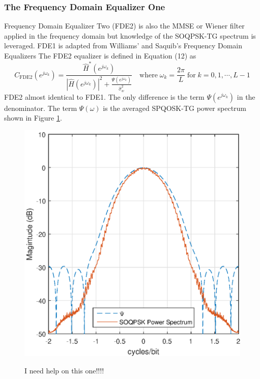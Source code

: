 \subsubsection{The Frequency Domain Equalizer One}
Frequency Domain Equalizer Two (FDE2) is also the MMSE or Wiener filter applied in the frequency domain but knowledge of the SOQPSK-TG spectrum is leveraged.
FDE1 is adapted from Williams' and Saquib's Frequency Domain Equalizers \cite[eq. (12)]{williams2013linear}
The FDE2 equalizer is defined in Equation (12) as
\begin{equation}
C_\text{FDE2}(e^{j\omega_k}) = \frac{\hat{H}^\ast(e^{j\omega_k})}  {|\hat{H}(e^{j\omega_k})|^2  +  \frac{\Psi(e^{j\omega_k})}{\hat{\sigma}^2_w}} \quad
\text{where} \;
\omega_k = \frac{2\pi}{L} \;
\text{for} \;
k=0,1,\cdots,L-1
\label{eq:FDE2}
\end{equation}
FDE2 almost identical to FDE1.
The only difference is the term $\Psi(e^{j\omega_k})$ in the denominator. 
The term $\Psi(\omega)$ is the averaged SPQOSK-TG power spectrum shown in Figure \ref{fig:SOQPSK_spectrum}.
\begin{figure}
	\caption{I need help on this one!!!! }
	\centering\includegraphics[width=5in]{figures/eq_equations/FDE2_spectrum_PSI.eps}
	\label{fig:SOQPSK_spectrum}
\end{figure}
